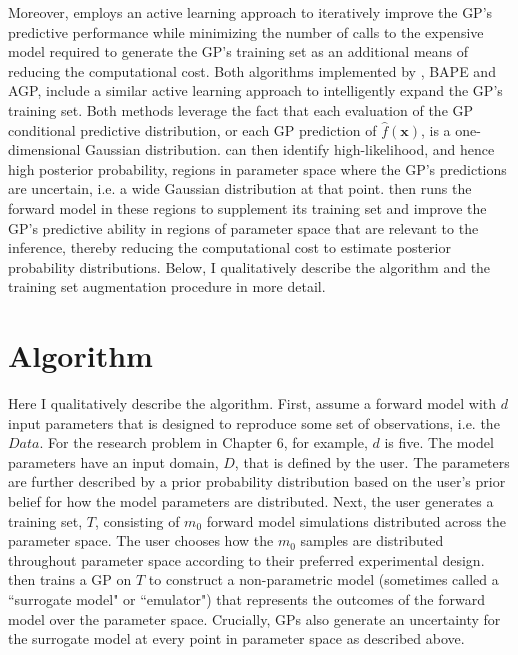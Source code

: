 Moreover, \approxposterior employs an active learning approach to iteratively improve the GP's predictive performance while minimizing the number of calls to the expensive model required to generate the GP's training set as an additional means of reducing the computational cost. Both algorithms implemented by \approxposterior, BAPE and AGP, include a similar active learning approach to intelligently expand the GP's training set. Both methods leverage the fact that each evaluation of the GP conditional predictive distribution, or each GP prediction of $\hat{f}(\textbf{x})$, is a one-dimensional Gaussian distribution.  \approxposterior can then identify high-likelihood, and hence high posterior probability, regions in parameter space where the GP's predictions are uncertain, i.e. a wide Gaussian distribution at that point.  \approxposterior then runs the forward model in these regions to supplement its training set and improve the GP's predictive ability in regions of parameter space that are relevant to the inference, thereby reducing the computational cost to estimate posterior probability distributions. Below, I qualitatively describe the \approxposterior algorithm and the training set augmentation procedure in more detail.

\section{\approxposterior Algorithm} \label{AP:sec:app}

Here I qualitatively describe the \approxposterior algorithm. First, assume a forward model with $d$ input parameters that is designed to reproduce some set of observations, i.e. the $Data$. For the research problem in Chapter 6, for example, $d$ is five. The model parameters have an input domain, $D$, that is defined by the user. The parameters are further described by a prior probability distribution based on the user's prior belief for how the model parameters are distributed.  Next, the user generates a training set, $T$, consisting of $m_0$ forward model simulations distributed across the parameter space. The user chooses how the $m_0$ samples are distributed throughout parameter space according to their preferred experimental design. \approxposterior then trains a GP on $T$ to construct a non-parametric model (sometimes called a ``surrogate model" or ``emulator") that represents the outcomes of the forward model over the parameter space. Crucially, GPs also generate an uncertainty for the surrogate model at every point in parameter space as described above.

